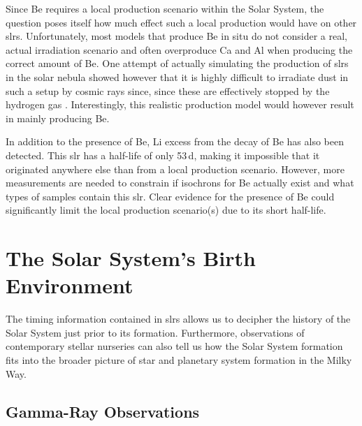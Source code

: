 Since Be requires a local production scenario within the Solar System, the question poses itself how much effect such a local production would have on other \acp{slr}. Unfortunately, most models that produce Be in situ do not consider a real, actual irradiation scenario and often overproduce Ca and Al when producing the correct amount of Be. One attempt of actually simulating the production of \acp{slr} in the solar nebula showed however that it is highly difficult to irradiate dust in such a setup by cosmic rays since, since these are effectively stopped by the hydrogen gas \citep{trappitsch15}. Interestingly, this realistic production model would however result in mainly producing Be.

In addition to the presence of Be, Li excess from the decay of Be has also been detected. This \ac{slr} has a half-life of only 53\,d, making it impossible that it originated anywhere else than from a local production scenario. However, more measurements are needed to constrain if isochrons for Be actually exist and what types of samples contain this \ac{slr}. Clear evidence for the presence of Be could significantly limit the local production scenario(s) due to its short half-life.

\section{The Solar System's Birth Environment}

The timing information contained in \acp{slr} allows us to decipher the history of the Solar System just prior to its formation. Furthermore, observations of contemporary stellar nurseries can also tell us how the Solar System formation fits into the broader picture of star and planetary system formation in the Milky Way.

\subsection{Gamma-Ray Observations}

